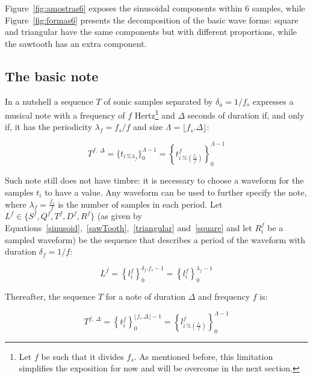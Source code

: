Figure~\ref{fig:amostras6} exposes the sinusoidal components within 6 samples,
while Figure~\ref{fig:formas6} presents the decomposition of the basic wave forms:
square and triangular have the same components but with different proportions, while the sawtooth has an extra component.


\subsection{The basic note}\label{notaBasica}
In a nutshell
a sequence $T$ of sonic samples separated by $\delta_a=1/f_s$ expresses a musical note with
a frequency of $f$ Hertz\footnote{Let $f$ be such that it divides $f_s$.
As mentioned before, this limitation simplifies the exposition for now
and will be overcome in the next section.} and $\Delta$ seconds of duration if,
and only if, it has the periodicity $\lambda_f=f_s/f$ and size $\Lambda=\lfloor f_s . \Delta \rfloor$:

\begin{equation}\label{eq:notaBasica}
T^{f,\; \Delta}=\{t_{i \, \% \lambda_f} \}_0^{\Lambda-1}= \left \{t^f_{i \; \% \left( \frac{f_s}{f} \right) } \right \}_0^{\Lambda-1}
\end{equation}

Such note still does not have timbre: it is necessary to choose a waveform for the samples $t_i$ to have a value.
Any waveform can be used to further specify the note,
where $\lambda_f=\frac{f_s}{f}$ is the number of samples in each period.
Let $L^f \in \{S^f,Q^f,T^f,D^f,R^f \}$
(as given by Equations~\ref{sinusoid},~\ref{sawTooth},~\ref{triangular}
and~\ref{square} and let $R_i^f$ be a sampled waveform)
be the sequence that describes a period of the waveform 
 with duration $\delta_f=1/f$:

\begin{equation}\label{periodoUnico}
L^{f} = \left\{ l_i^f \right\}_0^{\delta_f . f_s -1}=\left\{ l_i^f \right\}_0^{\lambda_f-1}
\end{equation}

Thereafter, the sequence $T$ for a note of duration $\Delta$ and frequency $f$ is:

\begin{equation}\label{eq:notaBasicaTimbre}
T^{f,\; \Delta}=\left\{t_i^f\right\}_0^{\lfloor f_s . \Delta \rfloor -1}=\left \{ l^f_{i\,\%\left(\frac{f_s}{f}\right)} \right \}_0^{\Lambda-1}
\end{equation}

